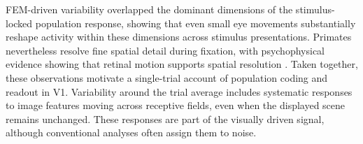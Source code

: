 \documentclass{lite}
\begin{document}
FEM-driven variability overlapped the dominant dimensions of the stimulus-locked population response, showing that even small eye movements substantially reshape activity within these dimensions across stimulus presentations. Primates nevertheless resolve fine spatial detail during fixation, with psychophysical evidence showing that retinal motion supports spatial resolution \cite{rucci2007miniature, intoy2020finely}. Taken together, these observations motivate a single-trial account of population coding and readout in V1. Variability around the trial average includes systematic responses to image features moving across receptive fields, even when the displayed scene remains unchanged. These responses are part of the visually driven signal, although conventional analyses often assign them to noise.  




\end{document}

